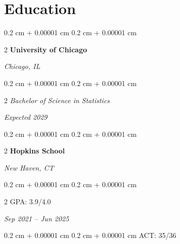 \documentclass[10pt, letterpaper]{article}
\newenvironment{onecolentry}{
    \begin{adjustwidth}{
        0.2 cm + 0.00001 cm
    }{
        0.2 cm + 0.00001 cm
    }
}{
    \end{adjustwidth}
} %
\newenvironment{twocolentry}[2][]{
    \onecolentry
    \def\secondColumn{#2}
    \setcolumnwidth{\fill, 4.5 cm}
    \begin{paracol}{2}
}{
    \switchcolumn \raggedleft \secondColumn
    \end{paracol}
    \endonecolentry
} %
\let\hrefWithoutArrow\href
\renewcommand{\href}[2]{\hrefWithoutArrow{#1}{\ifthenelse{\equal{#2}{}}{ }{#2 }\raisebox{.15ex}{\footnotesize \faExternalLink*}}}
\begin{document}



    

    \section{Education}
    
    \begin{twocolentry}{\textit{Chicago, IL}}{\textbf{University of Chicago}}
    \end{twocolentry}
    \begin{twocolentry} {\textit{Expected 2029}}{\textit{Bachelor of Science in Statistics}}
    \end{twocolentry}
    \vspace{0.2cm}
    
    \begin{twocolentry}{\textit{New Haven, CT}}{\textbf{Hopkins School}}
    \end{twocolentry}
    
    \vspace{0.1cm}
    \begin{twocolentry}{\textit{Sep 2021 – Jun 2025}}{GPA: 3.9/4.0}
    \end{twocolentry}
    \vspace{0.1cm}
    \begin{onecolentry}{ACT: 35/36}
    \end{onecolentry}
    
\end{document}

